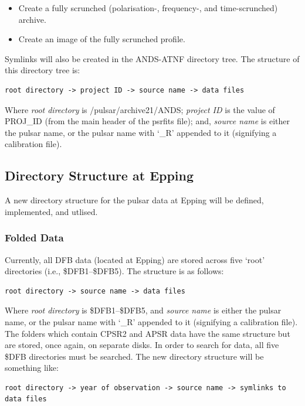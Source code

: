 \documentclass[a4paper,11pt]{article}
\begin{document}
\begin{itemize}
\item Create a fully scrunched (polarisation-, frequency-, and time-scrunched) archive.
\item Create an image of the fully scrunched profile.
\end{itemize}

Symlinks will also be created in the ANDS-ATNF directory tree. The structure of this directory tree is:

\begin{verbatim}
root directory -> project ID -> source name -> data files
\end{verbatim}

Where \emph{root directory} is /pulsar/archive21/ANDS; \emph{project ID} is the value of PROJ\_ID (from the main header of the psrfits file); and, \emph{source name} is either the pulsar name, or the pulsar name with `\_R' appended to it (signifying a calibration file).

\subsection{Directory Structure at Epping}
A new directory structure for the pulsar data at Epping will be defined, implemented, and utlised.

\subsubsection{Folded Data}
Currently, all DFB data (located at Epping) are stored across five `root' directories (i.e., \$DFB1--\$DFB5). The structure is as follows:

\begin{verbatim}
root directory -> source name -> data files
\end{verbatim}

Where \emph{root directory} is \$DFB1--\$DFB5, and \emph{source name} is either the pulsar name, or the pulsar name with `\_R' appended to it (signifying a calibration file). The folders which contain CPSR2 and APSR data have the same structure but are stored, once again, on separate disks. In order to search for data, all five \$DFB directories must be searched. The new directory structure will be something like:

\begin{verbatim}
root directory -> year of observation -> source name -> symlinks to data files
\end{verbatim}
\end{document}

